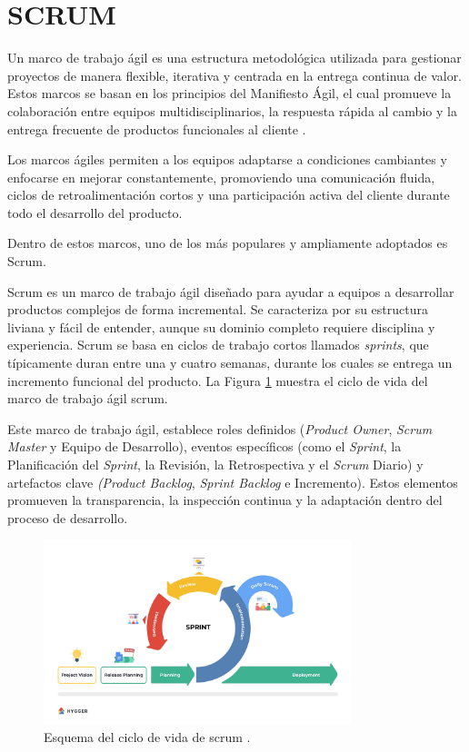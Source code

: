\section{SCRUM}

Un marco de trabajo ágil es una estructura metodológica utilizada para gestionar proyectos de manera flexible, iterativa y centrada en la entrega continua de valor. Estos marcos se basan en los principios del Manifiesto Ágil, el cual promueve la colaboración entre equipos multidisciplinarios, la respuesta rápida al cambio y la entrega frecuente de productos funcionales al cliente \cite{beck2001manifesto}.

Los marcos ágiles permiten a los equipos adaptarse a condiciones cambiantes y enfocarse en mejorar constantemente, promoviendo una comunicación fluida, ciclos de retroalimentación cortos y una participación activa del cliente durante todo el desarrollo del producto.

Dentro de estos marcos, uno de los más populares y ampliamente adoptados es Scrum. 

Scrum es un marco de trabajo ágil diseñado para ayudar a equipos a desarrollar productos complejos de forma incremental. Se caracteriza por su estructura liviana y fácil de entender, aunque su dominio completo requiere disciplina y experiencia. Scrum se basa en ciclos de trabajo cortos llamados \textit{sprints}, que típicamente duran entre una y cuatro semanas, durante los cuales se entrega un incremento funcional del producto. La Figura \ref{fig.SCRUM} muestra el ciclo de vida del marco de trabajo ágil scrum.

Este marco de trabajo ágil, establece roles definidos (\textit{Product Owner}, \textit{Scrum Master} y Equipo de Desarrollo), eventos específicos (como el \textit{Sprint}, la Planificación del \textit{Sprint}, la Revisión, la Retrospectiva y el \textit{Scrum} Diario) y artefactos clave \textit{(Product Backlog}, \textit{Sprint Backlog} e Incremento). Estos elementos promueven la transparencia, la inspección continua y la adaptación dentro del proceso de desarrollo.


\begin{figure}[H]
    \centering
    \includegraphics[width=0.8\textwidth]{./img/metodologia/scrum.jpg}
    \caption{Esquema del ciclo de vida de scrum \cite{schwaber2020scrum2}.}
    \label{fig.SCRUM}
\end{figure}

